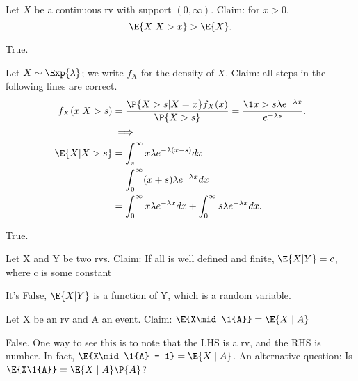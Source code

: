 \documentclass[tf-tutorial-all.tex]{subfiles}
\begin{document}
\begin{truefalse}
Let $X$ be a continuous rv with support $(0, \infty)$. Claim: for $x>0$,
\begin{equation}
\label{eq:6}
\E{X|X>x}>\E{X}.
\end{equation}
\begin{solution}
True.
\end{solution}
\end{truefalse}

\begin{truefalse}
Let $X \sim \Exp{\lambda}$; we write $f_{X}$ for the density of $X$.
Claim:  all steps in the following lines are correct.
\begin{align*}
 f_{X}(x|X>s) &= \frac{\P{X>s|X=x}f_{X}(x)}{\P{X>s}} = \frac{ \1{x > s} \lambda e^{-\lambda x}}{e^{-\lambda s}}. \\
&  \implies \\
    \E{X|X>s} &= \int^{\infty}_{s} x \lambda e^{-\lambda(x-s)} dx\\
    &= \int^{\infty}_{0}(x + s) \lambda e^{-\lambda x} dx \\
    &= \int^{\infty}_{0}x  \lambda e^{-\lambda x} dx + \int^{\infty}_{0} s \lambda e^{-\lambda x} dx.
\end{align*}
\begin{solution}
True.
\end{solution}
\end{truefalse}

\begin{truefalse}
Let X and Y be two rvs. Claim:
If all is well defined and finite, $\E{X|Y} = c$, where c is some constant
\begin{solution}
It's False, $\E{X|Y}$ is a function of Y, which is a random variable.
\end{solution}
\end{truefalse}

\begin{truefalse}
Let X be an rv and A an event. Claim: $\E{X\mid\1{A}} = \E{X\mid A}$
\begin{solution}
  False. One way to see this is to note that the LHS is a rv, and the RHS is number. In fact, $\E{X\mid\1{A} = 1} = \E{X\mid A}$.
  An alternative question: Is $\E{X\1{A}} = \E{X\mid A} \P{A}$?
\end{solution}
\end{truefalse}
\end{document}
